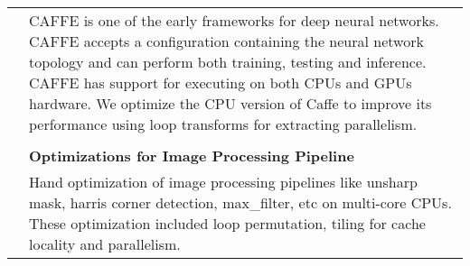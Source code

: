 \documentclass[a4paper,10pt]{article} %
\begin{document}
\begin{tabular}{rp{13cm}}
& \setlength{\leftskip}{0.4cm}
CAFFE is one of the early frameworks for deep neural networks. CAFFE accepts a configuration containing the neural network topology and can perform both training, testing and inference. CAFFE has support for executing  on both CPUs and GPUs hardware. We optimize the CPU version of Caffe to improve its performance using loop transforms for extracting parallelism.\\
&\\
& \textbf{Optimizations for Image Processing Pipeline} \\
& \setlength{\leftskip}{0.4cm}
Hand optimization of image processing pipelines like unsharp mask, harris corner detection, max\_filter, etc on multi-core CPUs. These optimization included loop permutation, tiling for cache locality and parallelism.\\
\end{tabular}
\end{document}

